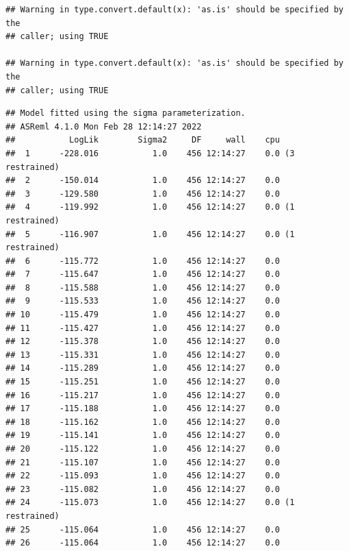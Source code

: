 \documentclass[
  12pt,
]{book}
\newenvironment{Shaded}{\begin{snugshade}}{\end{snugshade}}
\newcommand{\DataTypeTok}[1]{\textcolor[rgb]{0.13,0.29,0.53}{#1}}
\newcommand{\DecValTok}[1]{\textcolor[rgb]{0.00,0.00,0.81}{#1}}
\newcommand{\KeywordTok}[1]{\textcolor[rgb]{0.13,0.29,0.53}{\textbf{#1}}}
\newcommand{\NormalTok}[1]{#1}
\newcommand{\OperatorTok}[1]{\textcolor[rgb]{0.81,0.36,0.00}{\textbf{#1}}}
\newcommand{\OtherTok}[1]{\textcolor[rgb]{0.56,0.35,0.01}{#1}}
\newcommand{\StringTok}[1]{\textcolor[rgb]{0.31,0.60,0.02}{#1}}
\begin{document}
\begin{verbatim}
## Warning in type.convert.default(x): 'as.is' should be specified by the
## caller; using TRUE

## Warning in type.convert.default(x): 'as.is' should be specified by the
## caller; using TRUE
\end{verbatim}

\begin{verbatim}
## Model fitted using the sigma parameterization.
## ASReml 4.1.0 Mon Feb 28 12:14:27 2022
##           LogLik        Sigma2     DF     wall    cpu
##  1      -228.016           1.0    456 12:14:27    0.0 (3 restrained)
##  2      -150.014           1.0    456 12:14:27    0.0
##  3      -129.580           1.0    456 12:14:27    0.0
##  4      -119.992           1.0    456 12:14:27    0.0 (1 restrained)
##  5      -116.907           1.0    456 12:14:27    0.0 (1 restrained)
##  6      -115.772           1.0    456 12:14:27    0.0
##  7      -115.647           1.0    456 12:14:27    0.0
##  8      -115.588           1.0    456 12:14:27    0.0
##  9      -115.533           1.0    456 12:14:27    0.0
## 10      -115.479           1.0    456 12:14:27    0.0
## 11      -115.427           1.0    456 12:14:27    0.0
## 12      -115.378           1.0    456 12:14:27    0.0
## 13      -115.331           1.0    456 12:14:27    0.0
## 14      -115.289           1.0    456 12:14:27    0.0
## 15      -115.251           1.0    456 12:14:27    0.0
## 16      -115.217           1.0    456 12:14:27    0.0
## 17      -115.188           1.0    456 12:14:27    0.0
## 18      -115.162           1.0    456 12:14:27    0.0
## 19      -115.141           1.0    456 12:14:27    0.0
## 20      -115.122           1.0    456 12:14:27    0.0
## 21      -115.107           1.0    456 12:14:27    0.0
## 22      -115.093           1.0    456 12:14:27    0.0
## 23      -115.082           1.0    456 12:14:27    0.0
## 24      -115.073           1.0    456 12:14:27    0.0 (1 restrained)
## 25      -115.064           1.0    456 12:14:27    0.0
## 26      -115.064           1.0    456 12:14:27    0.0
\end{verbatim}

\begin{Shaded}
\end{Shaded}
\end{document}
